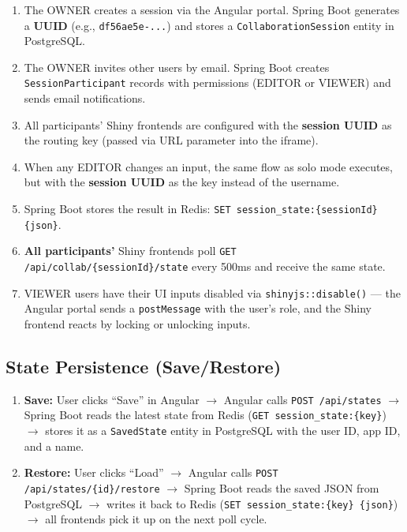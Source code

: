 \documentclass[12pt,a4paper]{article}
\begin{document}
\begin{enumerate}[nosep]
  \item The OWNER creates a session via the Angular portal. Spring Boot generates a \textbf{UUID} (e.g., \texttt{df56ae5e-...}) and stores a \texttt{CollaborationSession} entity in PostgreSQL.
  \item The OWNER invites other users by email. Spring Boot creates \texttt{SessionParticipant} records with permissions (EDITOR or VIEWER) and sends email notifications.
  \item All participants' Shiny frontends are configured with the \textbf{session UUID} as the routing key (passed via URL parameter into the iframe).
  \item When any EDITOR changes an input, the same flow as solo mode executes, but with the \textbf{session UUID} as the key instead of the username.
  \item Spring Boot stores the result in Redis: \texttt{SET session\_state:\{sessionId\} \{json\}}.
  \item \textbf{All participants'} Shiny frontends poll \texttt{GET /api/collab/\{sessionId\}/state} every 500ms and receive the same state.
  \item VIEWER users have their UI inputs disabled via \texttt{shinyjs::disable()} --- the Angular portal sends a \texttt{postMessage} with the user's role, and the Shiny frontend reacts by locking or unlocking inputs.
\end{enumerate}

\subsection{State Persistence (Save/Restore)}

\begin{enumerate}[nosep]
  \item \textbf{Save:} User clicks ``Save'' in Angular $\rightarrow$ Angular calls \texttt{POST /api/states} $\rightarrow$ Spring Boot reads the latest state from Redis (\texttt{GET session\_state:\{key\}}) $\rightarrow$ stores it as a \texttt{SavedState} entity in PostgreSQL with the user ID, app ID, and a name.
  \item \textbf{Restore:} User clicks ``Load'' $\rightarrow$ Angular calls \texttt{POST /api/states/\{id\}/restore} $\rightarrow$ Spring Boot reads the saved JSON from PostgreSQL $\rightarrow$ writes it back to Redis (\texttt{SET session\_state:\{key\} \{json\}}) $\rightarrow$ all frontends pick it up on the next poll cycle.
\end{enumerate}
\end{document}
